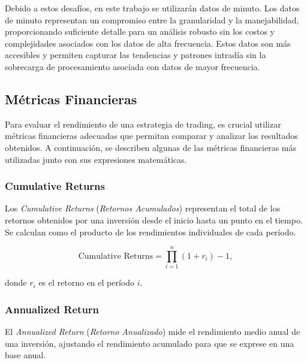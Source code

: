 \documentclass[a4paper,12pt, twoside]{report}
\begin{document}
Debido a estos desafíos, en este trabajo se utilizarán datos de minuto. Los datos de minuto representan un compromiso entre la 
granularidad y la manejabilidad, proporcionando suficiente detalle para un análisis robusto sin los costos y complejidades asociados 
con los datos de alta frecuencia. Estos datos son más accesibles y permiten capturar las tendencias y patrones intradía sin la 
sobrecarga de procesamiento asociada con datos de mayor frecuencia.



\subsection{Métricas Financieras}

Para evaluar el rendimiento de una estrategia de trading, es crucial utilizar métricas financieras adecuadas que permitan comparar y analizar los resultados obtenidos. A continuación, se describen algunas de las métricas financieras más utilizadas junto con sus expresiones matemáticas.

\subsubsection{Cumulative Returns}

Los \textit{Cumulative Returns} (\textit{Retornos Acumulados}) representan el total de los retornos obtenidos por una inversión desde el inicio hasta un punto en el tiempo. Se calculan como el producto de los rendimientos individuales de cada período.

\begin{equation}
\text{Cumulative Returns} = \prod_{i=1}^{n} (1 + r_i) - 1,
\end{equation}

donde $r_i$ es el retorno en el período $i$.

\subsubsection{Annualized Return}

El \textit{Annualized Return} (\textit{Retorno Anualizado}) mide el rendimiento medio anual de una inversión, ajustando el rendimiento acumulado para que se exprese en una base anual.
\end{document}
